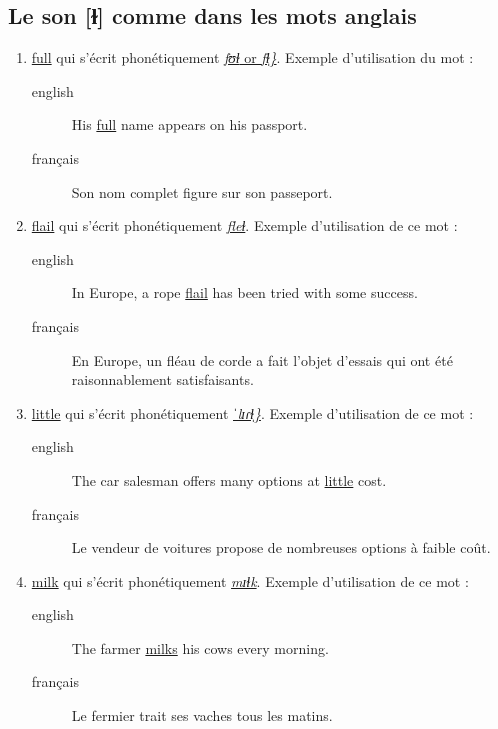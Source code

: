 \subsection{Le son [ɫ] comme dans les mots anglais}
\label{sec:org78aa354}
\begin{enumerate}
\item \href{http://www.wordreference.com/enfr/full}{full} qui s'écrit phonétiquement \href{https://home.cc.umanitoba.ca/\~krussll/phonetics/narrower/dark-l.html}{\emph{fʊɫ} or \emph{fɫ̩\}}}. Exemple
d'utilisation du mot :
\begin{description}
\item[{english}] \textenglish{His \href{https://youtu.be/TLmlgCteCMw}{full} name appears on his passport.}
\item[{français}] Son nom complet figure sur son passeport.
\end{description}
\item \href{http://www.wordreference.com/enfr/flail}{flail} qui s'écrit phonétiquement \href{https://home.cc.umanitoba.ca/\~krussll/phonetics/narrower/dark-l.html}{\emph{fleɫ}}. Exemple d'utilisation de
ce mot :
\begin{description}
\item[{english}] \textenglish{In Europe, a rope \href{https://youtu.be/AGf7n7iUF\_k}{flail} has been tried with some
success.}
\item[{français}] En Europe, un fléau de corde a fait l'objet d'essais
qui ont été raisonnablement satisfaisants.
\end{description}
\item \href{http://www.wordreference.com/enfr/little}{little} qui s'écrit phonétiquement \href{https://home.cc.umanitoba.ca/\~krussll/phonetics/narrower/dark-l.html}{\emph{ˈlɪɾɫ̩\}}}. Exemple d'utilisation
de ce mot :
\begin{description}
\item[{english}] \textenglish{The car salesman offers many options at \href{https://youtu.be/FokJGK639R4}{little} cost.}
\item[{français}] Le vendeur de voitures propose de nombreuses options à faible coût.
\end{description}
\item \href{http://www.wordreference.com/enfr/milk}{milk} qui s'écrit phonétiquement \href{https://home.cc.umanitoba.ca/\~krussll/phonetics/narrower/dark-l.html}{\emph{mɪɫk}}. Exemple d'utilisation de ce
mot :
\begin{description}
\item[{english}] \textenglish{The farmer \href{https://youtu.be/XBOE2CC0YYY}{milks} his cows every morning.}
\item[{français}] Le fermier trait ses vaches tous les matins.
\end{description}
\end{enumerate}